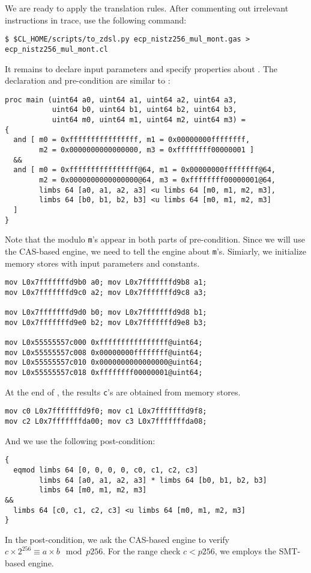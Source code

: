 \documentclass{amsproc}
\begin{document}
We are ready to apply the translation rules. After commenting out
irrelevant instructions in trace, use the following command:
\begin{verbatim}
$ $CL_HOME/scripts/to_zdsl.py ecp_nistz256_mul_mont.gas > ecp_nistz256_mul_mont.cl
\end{verbatim}

It remains to declare input parameters and specify properties about
\nistzmul. The declaration and pre-condition are similar to \nistzadd:
\begin{verbatim}
proc main (uint64 a0, uint64 a1, uint64 a2, uint64 a3,
           uint64 b0, uint64 b1, uint64 b2, uint64 b3,
           uint64 m0, uint64 m1, uint64 m2, uint64 m3) =
{
  and [ m0 = 0xffffffffffffffff, m1 = 0x00000000ffffffff,
        m2 = 0x0000000000000000, m3 = 0xffffffff00000001 ]
  &&
  and [ m0 = 0xffffffffffffffff@64, m1 = 0x00000000ffffffff@64,
        m2 = 0x0000000000000000@64, m3 = 0xffffffff00000001@64,
        limbs 64 [a0, a1, a2, a3] <u limbs 64 [m0, m1, m2, m3],
        limbs 64 [b0, b1, b2, b3] <u limbs 64 [m0, m1, m2, m3]
  ]
}
\end{verbatim}
Note that the modulo \texttt{m}'s appear in both parts of
pre-condition. Since we will use the CAS-based engine, we need to tell
the engine about \texttt{m}'s. Simiarly, we initialize memory stores
with input parameters and constants.
\begin{verbatim}
mov L0x7fffffffd9b0 a0; mov L0x7fffffffd9b8 a1;
mov L0x7fffffffd9c0 a2; mov L0x7fffffffd9c8 a3;

mov L0x7fffffffd9d0 b0; mov L0x7fffffffd9d8 b1;
mov L0x7fffffffd9e0 b2; mov L0x7fffffffd9e8 b3;

mov L0x55555557c000 0xffffffffffffffff@uint64;
mov L0x55555557c008 0x00000000ffffffff@uint64;
mov L0x55555557c010 0x0000000000000000@uint64;
mov L0x55555557c018 0xffffffff00000001@uint64;
\end{verbatim}


At the end of \nistzmulcl, the results \texttt{c}'s are obtained from
memory stores.
\begin{verbatim}
mov c0 L0x7fffffffd9f0; mov c1 L0x7fffffffd9f8;
mov c2 L0x7fffffffda00; mov c3 L0x7fffffffda08;
\end{verbatim}
And we use the following post-condition:
\begin{verbatim}
{
  eqmod limbs 64 [0, 0, 0, 0, c0, c1, c2, c3]
        limbs 64 [a0, a1, a2, a3] * limbs 64 [b0, b1, b2, b3]
        limbs 64 [m0, m1, m2, m3]
&&
  limbs 64 [c0, c1, c2, c3] <u limbs 64 [m0, m1, m2, m3]
}
\end{verbatim}
In the post-condition, we ask the CAS-based engine to verify $c \times
2^{256} \equiv a \times b \mod p256$. For the range check $c < p256$,
we employs the SMT-based engine.
\end{document}
